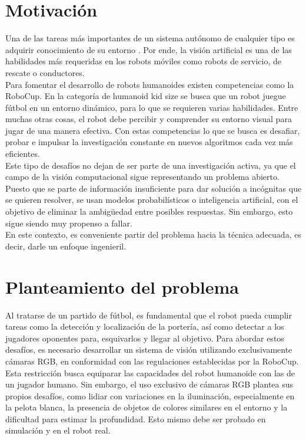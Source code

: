 \section{Motivación}
Una de las tareas más importantes de un sistema autónomo de cualquier tipo es adquirir conocimiento de su entorno\cite{siegwart2011introduction} . Por ende, la visión artificial es una de las habilidades más requeridas en los robots móviles como robots de servicio, de rescate o conductores.
\\
Para fomentar el desarrollo de robots humanoides existen competencias como la RoboCup. En la categoría de humanoid kid size se busca  que un robot juegue fútbol en un entorno dinámico, para lo que se requieren varias habilidades. Entre muchas otras cosas, el robot debe percibir y comprender su entorno visual para jugar de una manera efectiva. Con estas competencias lo que se busca es desafiar, probar e impulsar la investigación constante en nuevos algoritmos cada vez más eficientes. \cite{fiedler2019open} \\Este tipo de desafíos no dejan de ser parte de una investigación activa, ya que el campo de la visión computacional sigue representando un problema abierto. Puesto que se parte de información insuficiente para dar solución a incógnitas que se quieren resolver, se usan modelos probabilísticos o inteligencia artificial, con el objetivo de eliminar la ambigüedad entre posibles respuestas. Sin embargo, esto sigue siendo muy propenso a fallar.\\ En este contexto, es conveniente partir del problema hacia la técnica adecuada, es decir, darle un enfoque ingenieril. \cite{szeliski2022computer}

\section{Planteamiento del problema}
Al tratarse de un partido de fútbol, es fundamental que el robot pueda cumplir tareas como la detección y localización de la portería, así como detectar a los jugadores oponentes para, esquivarlos y llegar al objetivo. Para abordar estos desafíos, es necesario desarrollar un sistema de visión utilizando exclusivamente cámaras RGB, en conformidad con las regulaciones establecidas por la RoboCup.\\ Esta restricción busca equiparar las capacidades del robot humanoide con las de un jugador humano. Sin embargo, el uso exclusivo de cámaras RGB plantea sus propios desafíos, como lidiar con variaciones en la iluminación, especialmente en la pelota blanca, la presencia de objetos de colores similares en el entorno y la dificultad para estimar la profundidad. Esto mismo debe ser probado en simulación y en el robot real.

